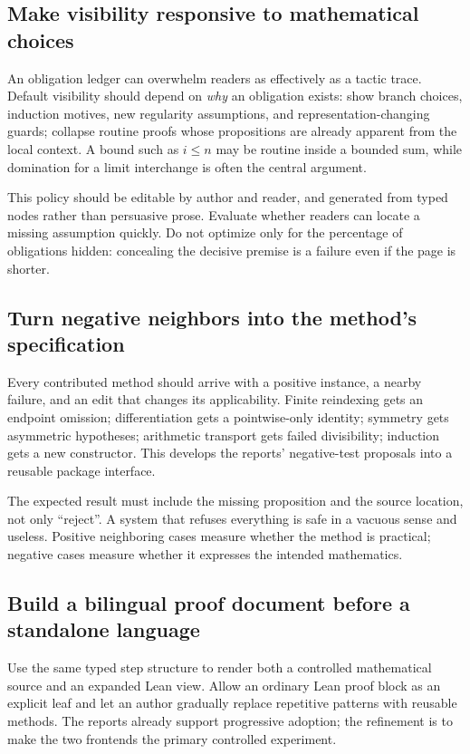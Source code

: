 \documentclass[11pt,letterpaper]{article}
\begin{document}
\subsection{Make visibility responsive to mathematical choices}
An obligation ledger can overwhelm readers as effectively as a tactic trace.
Default visibility should depend on \emph{why} an obligation exists: show branch
choices, induction motives, new regularity assumptions, and representation-changing
guards; collapse routine proofs whose propositions are already apparent from the
local context. A bound such as \(i\leq n\) may be routine inside a bounded sum,
while domination for a limit interchange is often the central argument.

This policy should be editable by author and reader, and generated from typed
nodes rather than persuasive prose. Evaluate whether readers can locate a missing
assumption quickly. Do not optimize only for the percentage of obligations hidden:
concealing the decisive premise is a failure even if the page is shorter.

\subsection{Turn negative neighbors into the method's specification}
Every contributed method should arrive with a positive instance, a nearby failure,
and an edit that changes its applicability. Finite reindexing gets an endpoint
omission; differentiation gets a pointwise-only identity; symmetry gets asymmetric
hypotheses; arithmetic transport gets failed divisibility; induction gets a new
constructor. This develops the reports' negative-test proposals into a reusable
package interface.

The expected result must include the missing proposition and the source location,
not only ``reject''. A system that refuses everything is safe in a vacuous sense
and useless. Positive neighboring cases measure whether the method is practical;
negative cases measure whether it expresses the intended mathematics.

\subsection{Build a bilingual proof document before a standalone language}
Use the same typed step structure to render both a controlled mathematical source
and an expanded Lean view. Allow an ordinary Lean proof block as an explicit leaf
and let an author gradually replace repetitive patterns with reusable methods.
The reports already support progressive adoption; the refinement is to make the
two frontends the primary controlled experiment.
\end{document}
